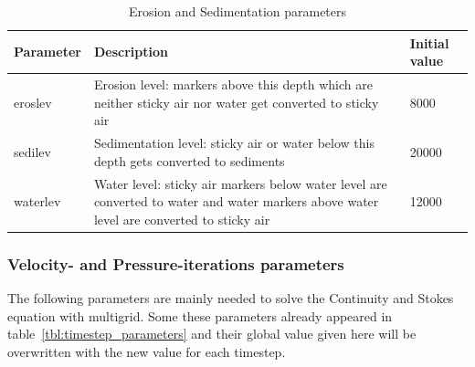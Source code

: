 \begin{table}[H]
\small
\centering
\begin{tabular}{l p{10cm} l}
\toprule
Parameter & Description & Initial value \\
\midrule
eroslev 	& Erosion level: markers above this depth which are neither sticky air nor water get converted to sticky air & 8000\\
sedilev 	& Sedimentation level: sticky air or water below this depth gets converted to sediments & 20000\\
waterlev 	& Water level: sticky air markers below water level are converted to water and water markers above water level are converted to sticky air & 12000\\
\bottomrule
\end{tabular}
\caption{Erosion and Sedimentation parameters}
\label{tbl:mode_sed_parameters}
\end{table}

\subsubsection{Velocity- and Pressure-iterations parameters}
The following parameters are mainly needed to solve the Continuity and Stokes equation with multigrid. Some these parameters already appeared in table~\ref{tbl:timestep_parameters} and their global value given here will be overwritten with the new value for each timestep. 

